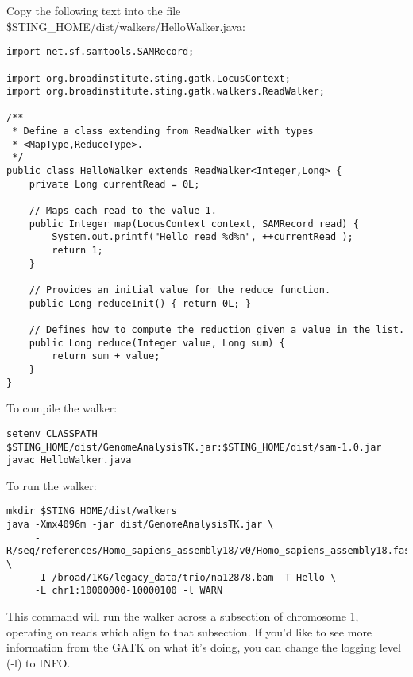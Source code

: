 \documentclass[11pt,fullpage]{article}
\begin{document}
\begin{samepage}
Copy the following text into the file \$STING\_HOME/dist/walkers/HelloWalker.java:

\begin{verbatim}
import net.sf.samtools.SAMRecord;

import org.broadinstitute.sting.gatk.LocusContext;
import org.broadinstitute.sting.gatk.walkers.ReadWalker;

/**
 * Define a class extending from ReadWalker with types
 * <MapType,ReduceType>.  
 */
public class HelloWalker extends ReadWalker<Integer,Long> {
    private Long currentRead = 0L;

    // Maps each read to the value 1.
    public Integer map(LocusContext context, SAMRecord read) {
        System.out.printf("Hello read %d%n", ++currentRead );
        return 1; 
    }

    // Provides an initial value for the reduce function.
    public Long reduceInit() { return 0L; }
    
    // Defines how to compute the reduction given a value in the list. 
    public Long reduce(Integer value, Long sum) { 
        return sum + value;
    }
}
\end{verbatim}
\end{samepage}
To compile the walker:
\begin{verbatim}
setenv CLASSPATH $STING_HOME/dist/GenomeAnalysisTK.jar:$STING_HOME/dist/sam-1.0.jar
javac HelloWalker.java
\end{verbatim}
To run the walker:
\begin{verbatim}
mkdir $STING_HOME/dist/walkers
java -Xmx4096m -jar dist/GenomeAnalysisTK.jar \
     -R/seq/references/Homo_sapiens_assembly18/v0/Homo_sapiens_assembly18.fasta \
     -I /broad/1KG/legacy_data/trio/na12878.bam -T Hello \
     -L chr1:10000000-10000100 -l WARN
\end{verbatim}
This command will run the walker across a subsection of chromosome 1, operating on 
reads which align to that subsection.  If you'd like to see more information from the GATK 
on what it's doing, you can change the logging level (-l) to INFO.
\end{document}
